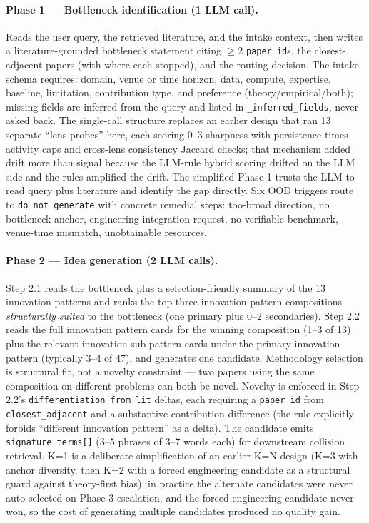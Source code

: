 \documentclass[10pt,a4paper]{article}
\begin{document}
\paragraph{Phase 1 --- Bottleneck identification (1 LLM call).} Reads the user query, the retrieved literature, and the intake context, then writes a literature-grounded bottleneck statement citing $\geq 2$ \texttt{paper\_id}s, the closest-adjacent papers (with where each stopped), and the routing decision. The intake schema requires: domain, venue or time horizon, data, compute, expertise, baseline, limitation, contribution type, and preference (theory/empirical/both); missing fields are inferred from the query and listed in \texttt{\_inferred\_fields}, never asked back. The single-call structure replaces an earlier design that ran 13 separate ``lens probes'' here, each scoring 0--3 sharpness with persistence times activity caps and cross-lens consistency Jaccard checks; that mechanism added drift more than signal because the LLM-rule hybrid scoring drifted on the LLM side and the rules amplified the drift. The simplified Phase 1 trusts the LLM to read query plus literature and identify the gap directly. Six OOD triggers route to \texttt{do\_not\_generate} with concrete remedial steps: too-broad direction, no bottleneck anchor, engineering integration request, no verifiable benchmark, venue-time mismatch, unobtainable resources.

\paragraph{Phase 2 --- Idea generation (2 LLM calls).} Step 2.1 reads the bottleneck plus a selection-friendly summary of the 13 innovation patterns and ranks the top three innovation pattern compositions \emph{structurally suited} to the bottleneck (one primary plus 0--2 secondaries). Step 2.2 reads the full innovation pattern cards for the winning composition (1--3 of 13) plus the relevant innovation sub-pattern cards under the primary innovation pattern (typically 3--4 of 47), and generates one candidate. Methodology selection is structural fit, not a novelty constraint --- two papers using the same composition on different problems can both be novel. Novelty is enforced in Step 2.2's \texttt{differentiation\_from\_lit} deltas, each requiring a \texttt{paper\_id} from \texttt{closest\_adjacent} and a substantive contribution difference (the rule explicitly forbids ``different innovation pattern'' as a delta). The candidate emits \texttt{signature\_terms[]} (3--5 phrases of 3--7 words each) for downstream collision retrieval. K=1 is a deliberate simplification of an earlier K=N design (K=3 with anchor diversity, then K=2 with a forced engineering candidate as a structural guard against theory-first bias): in practice the alternate candidates were never auto-selected on Phase 3 escalation, and the forced engineering candidate never won, so the cost of generating multiple candidates produced no quality gain.
\end{document}
